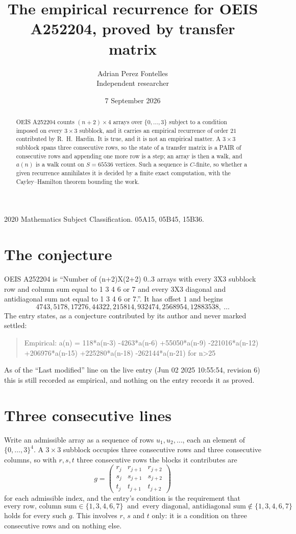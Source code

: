 \documentclass[11pt,a4paper]{article}
\title{The empirical recurrence for OEIS A252204, proved by transfer matrix}
\author{Adrian Perez Fontelles\\ \small Independent researcher}
\date{7 September 2026}
\theoremstyle{plain}
\theoremstyle{definition}
\begin{document}
\maketitle

\begin{abstract}
OEIS A252204 counts $(n+2)\times4$ arrays over $\{0,\dots,3\}$ subject to a condition imposed on
every $3\times3$ subblock, and it carries an empirical recurrence of order $21$
contributed by R.~H.~Hardin. It is true, and it is not an empirical matter. A $3\times3$
subblock spans three consecutive rows, so the state of a transfer matrix is a PAIR of
consecutive rows and appending one more row is a step; an array is then a walk, and
$a(n)$ is a walk count on $S=65536$ vertices. Such a sequence is $C$-finite, so whether a given
recurrence annihilates it is decided by a finite exact computation, with the Cayley--Hamilton
theorem bounding the work.
\end{abstract}

\noindent\small 2020 Mathematics Subject Classification. 05A15, 05B45, 15B36.\normalsize

\section{The conjecture}

OEIS A252204 is ``Number of (n+2)X(2+2) 0..3 arrays with every 3X3 subblock row and column sum equal to 1 3 4 6 or 7 and every 3X3 diagonal and antidiagonal sum not equal to 1 3 4 6 or 7.''. It has offset $1$ and begins
\[
4743, 5178, 17276, 44322, 215814, 932474, 2568954, 12883538,\ \dots
\]
The entry states, as a conjecture contributed by its author and never marked settled:
\begin{quote}
Empirical: a(n) = 118*a(n-3) -4263*a(n-6) +55050*a(n-9) -221016*a(n-12) +206976*a(n-15) +225280*a(n-18) -262144*a(n-21) for n>25
\end{quote}
As of the ``Last modified'' line on the live entry (Jun 02 2025 10:55:54, revision 6) this is still
recorded as empirical, and nothing on the entry records it as proved.

\section{Three consecutive lines}

Write an admissible array as a sequence of rows $u_1,u_2,\dots$, each an element of
$\{0,\dots,3\}^{4}$. A $3\times3$ subblock occupies three consecutive rows and
three consecutive columns, so with $r,s,t$ three consecutive rows the blocks it
contributes are
\[
g=\begin{pmatrix}r_j&r_{j+1}&r_{j+2}\\ s_j&s_{j+1}&s_{j+2}\\ t_j&t_{j+1}&t_{j+2}\end{pmatrix}
\]
for each admissible index, and the entry's condition is the requirement that
\[
\text{every row, column sum} \in \{1,3,4,6,7\}\ \text{ and }\ \text{every diagonal, antidiagonal sum} \notin \{1,3,4,6,7\}
\]
holds for every such $g$. This involves $r$, $s$ and $t$ only: it is a condition on
three consecutive rows and on nothing else.
\end{document}
